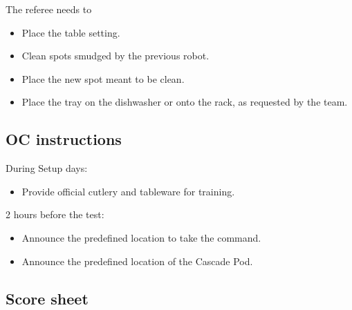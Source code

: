 The referee needs to
\begin{itemize}
	\item Place the table setting.
	\item Clean spots smudged by the previous robot.
	\item Place the new spot meant to be clean.
	\item Place the tray on the dishwasher or onto the rack, as requested by the team.
\end{itemize}

\subsection{OC instructions}
During Setup days:
\begin{itemize}
	\item Provide official cutlery and tableware for training.
\end{itemize}

2 hours before the test:
\begin{itemize}
	\item Announce the predefined location to take the command.
	\item Announce the predefined location of the Cascade Pod.
\end{itemize}

\newpage
\subsection{Score sheet}



